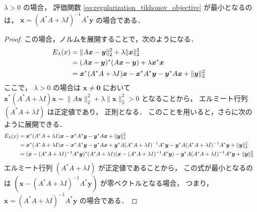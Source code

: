 \begin{theorem}\label{theorem:regularization_tikhonov_solution}
    $\lambda > 0$ の場合，
    評価関数 \eqref{eq:regularization_tikhonov_objective} が最小となるのは，
    $\bm{x} = (A^* A + \lambda I)^{-1} A^* \bm{y}$ の場合である．
\end{theorem}
\begin{proof}
    この場合，ノルムを展開することで，次のようになる．
    \begin{align}
        E_{\lambda}(x)
         & = \|A \bm{x} - \bm{y}\|_2^2 + \lambda \|\bm{x}\|_2^2
        \notag                                                                                              \\
         & = (A \bm{x} - \bm{y})^* (A \bm{x} - \bm{y}) + \lambda \bm{x}^* \bm{x}
        \notag                                                                                              \\
         & = \bm{x}^* (A^* A + \lambda I) \bm{x} - \bm{x}^* A^* \bm{y} - \bm{y}^* A \bm{x} + \|\bm{y}\|_2^2
    \end{align}
    ここで，
    $\lambda > 0$ の場合は
    $\bm{x} \neq \bm{0}$ において
    $\bm{x}^* (A^* A + \lambda I) \bm{x} = \|A \bm{x}\|_2^2 + \lambda \|\bm{x}\|_2^2 > 0$
    となることから，
    エルミート行列 $(A^* A + \lambda I)$ は正定値であり，
    正則となる．
    このことを用いると，さらに次のように展開できる．
    \begin{align}
        E_{\lambda}(x)
         & = \bm{x}^* (A^* A + \lambda I) \bm{x} - \bm{x}^* A^* \bm{y} - \bm{y}^* A \bm{x} + \|\bm{y}\|_2^2
        \notag                                                                                              \\
         & = \bm{x}^* (A^* A + \lambda I) \bm{x} - \bm{x}^* A^* \bm{y} - \bm{y}^* A \bm{x}
        + \bm{y}^* A (A^* A + \lambda I)^{-1} A^* \bm{y}
        - \bm{y}^* A (A^* A + \lambda I)^{-1} A^* \bm{y}
        + \|\bm{y}\|_2^2
        \notag                                                                                              \\
         & = (\bm{x} - (A^* A + \lambda I)^{-1} A^* \bm{y})^*
        (A^* A + \lambda I)
        (\bm{x} - (A^* A + \lambda I)^{-1} A^* \bm{y})
        - \bm{y}^* A (A^* A + \lambda I)^{-1} A^* \bm{y}
        + \|\bm{y}\|_2^2
    \end{align}
    エルミート行列 $(A^* A + \lambda I)$ が正定値であることから，
    この式が最小となるのは
    $(\bm{x} - (A^* A + \lambda I)^{-1} A^* \bm{y})$
    が零ベクトルとなる場合，
    つまり，
    $\bm{x} = (A^* A + \lambda I)^{-1} A^* \bm{y}$
    の場合である．
\end{proof}

